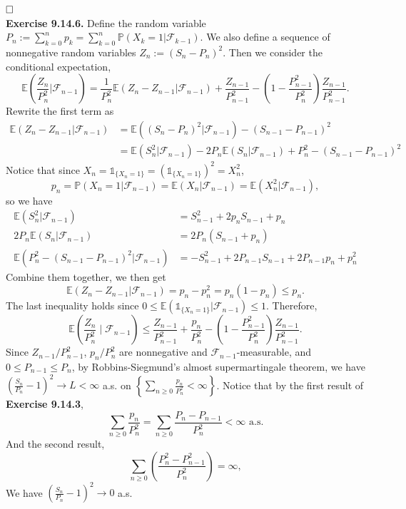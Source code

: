 \documentclass[12pt]{extarticle}
\begin{document}
$\hspace{\fill}\square$
\\
\textbf{Exercise 9.14.6.} 
Define the random variable $P_n:=\sum_{k=0}^np_k=\sum_{k=0}^n\mathbb{P}(X_k=1|\mathcal{F}_{k-1})$.
We also define a sequence of nonnegative random variables $Z_n:=(S_n-P_n)^2$.
Then we consider the conditional expectation, 
\[
\mathbb{E}\left(\frac{Z_n}{P_n^2}\bigg|\mathcal{F}_{n-1}\right)
=
\frac{1}{P_n^2}\mathbb{E}(Z_n-Z_{n-1}|\mathcal{F}_{n-1})
+
\frac{Z_{n-1}}{P_{n-1}^2}
-
\left(1-\frac{P_{n-1}^2}{P_n^2}\right)\frac{Z_{n-1}}{P_{n-1}^2}.
\]
Rewrite the first term as
\[
\begin{aligned}
\mathbb{E}(Z_n-Z_{n-1}|\mathcal{F}_{n-1})
&=
\mathbb{E}\left((S_n-P_n)^2|\mathcal{F}_{n-1}\right)-(S_{n-1}-P_{n-1})^2
\\&=
\mathbb{E}(S_n^2|\mathcal{F}_{n-1})-2P_n\mathbb{E}(S_n|\mathcal{F}_{n-1})+P_n^2-(S_{n-1}-P_{n-1})^2
\end{aligned}
\]
Notice that since $X_n=\mathds{1}_{\{X_n=1\}}=(\mathds{1}_{\{X_n=1\}})^2=X_n^2$,
\[
p_n
=
\mathbb{P}(X_n=1|\mathcal{F}_{n-1})
=
\mathbb{E}(X_n|\mathcal{F}_{n-1})
=
\mathbb{E}(X_n^2|\mathcal{F}_{n-1}),
\] 
so we have
\[
\begin{aligned}
\mathbb{E}(S_n^2|\mathcal{F}_{n-1})&=S_{n-1}^2+2p_nS_{n-1}+p_n
\\
2P_n\mathbb{E}(S_n|\mathcal{F}_{n-1})&=2P_n(S_{n-1}+p_n)
\\
\mathbb{E}\left(P_n^2-(S_{n-1}-P_{n-1})^2|\mathcal{F}_{n-1}\right)
&=
-S_{n-1}^2+2P_{n-1}S_{n-1}+2P_{n-1}p_n+p_n^2
\end{aligned}
\]
Combine them together, we then get
\[
\mathbb{E}(Z_n-Z_{n-1}|\mathcal{F}_{n-1})
=p_n-p_n^2=p_n(1-p_n)\leq p_n.
\]
The last inequality holds since $0\leq\mathbb{E}(\mathds{1}_{\{X_n=1\}}|\mathcal{F}_{n-1})\leq 1$.
Therefore,
\[
\mathbb{E}\left(\frac{Z_n}{P_n^2}\mid\mathcal{F}_{n-1}\right)
\leq
\frac{Z_{n-1}}{P_{n-1}^2}
+
\frac{p_n}{P_n^2}
-
\left(1-\frac{P_{n-1}^2}{P_n^2}\right)\frac{Z_{n-1}}{P_{n-1}^2}.
\]
Since $Z_{n-1}/P_{n-1}^2$, $p_n/P_n^2$ are nonnegative and $\mathcal{F}_{n-1}$-measurable, and $0\leq P_{n-1}\leq P_{n}$, by Robbins-Siegmund's almost supermartingale theorem, we have $\left(\frac{S_n}{P_n}-1\right)^2\rightarrow L<\infty$ a.s. on $\left\{\sum_{n\geq 0}\frac{p_n}{P_n^2}<\infty\right\}$.
Notice that by the first result of \textbf{Exercise 9.14.3},
\[
\sum_{n\geq 0}\frac{p_n}{P_n^2}=\sum_{n\geq 0}\frac{P_n-P_{n-1}}{P_n^2}<\infty \text{ a.s.}
\]
And the second result,
\[
\sum_{n\geq 0}\left(\frac{P_n^2-P_{n-1}^2}{P_n^2}\right)=\infty,
\]
We have $\left(\frac{S_n}{P_n}-1\right)^2\rightarrow 0$ a.s.
\end{document}
